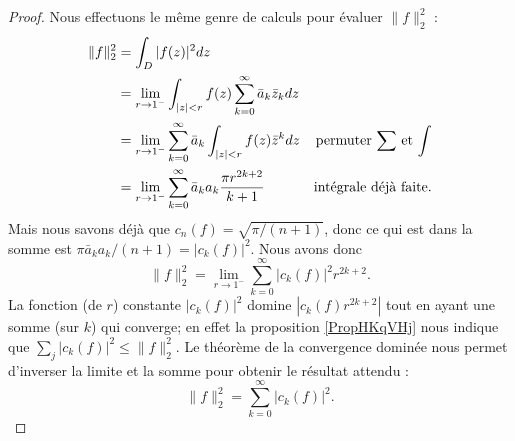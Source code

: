 \begin{proof}
    Nous effectuons le même genre de calculs pour évaluer \( \| f \|^2_2\) :
    \begin{subequations}
        \begin{align}
            \| f \|_2^2&=\int_D| f(z) |^2dz\\
            &=\lim_{r\to 1^-}\int_{| z |<r}f(z)\sum_{k=0}^{\infty}\bar a_k\bar z_kdz\\
            &=\lim_{r\to 1^-}\sum_{k=0}^{\infty}\bar a_k\int_{| z |<r}f(z)\bar z^kdz&\text{permuter \( \sum\) et \( \int\)}\\
            &=\lim_{r\to 1^-}\sum_{k=0}^{\infty}\bar a_ka_k\frac{ \pi r^{2k+2} }{ k+1 }&\text{intégrale déjà faite}.
        \end{align}
    \end{subequations}
    Mais nous savons déjà que \( c_n(f)=\sqrt{\pi/(n+1)}\), donc ce qui est dans la somme est \( \pi\bar a_ka_k/(n+1)=| c_k(f) |^2\). Nous avons donc
    \begin{equation}
        \| f \|^2_2=\lim_{r\to 1^-}\sum_{k=0}^{\infty}| c_k(f) |^2 r^{2k+2}.
    \end{equation}
    La fonction (de \( r\)) constante \( | c_k(f) |^2\) domine \( | c_k(f)r^{2k+2} |\) tout en ayant une somme (sur \( k\)) qui converge; en effet la proposition \ref{PropHKqVHj} nous indique que \( \sum_j| c_k(f) |^2\leq \| f \|_2^2\). Le théorème de la convergence dominée nous permet d'inverser la limite et la somme pour obtenir le résultat attendu :
    \begin{equation}
        \| f \|_2^2=\sum_{k=0}^{\infty}| c_k(f) |^2.
    \end{equation}
\end{proof}
